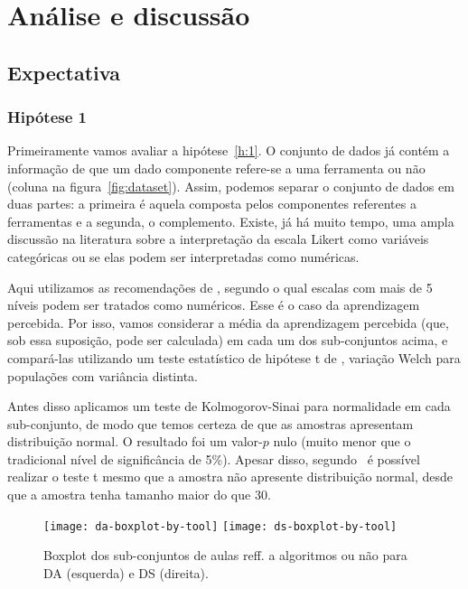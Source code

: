\section{Análise e discussão}

\subsection{Expectativa}

\subsubsection{Hipótese 1}

Primeiramente vamos avaliar a hipótese~\ref{h:1}.
O conjunto de dados já contém a informação de que um dado componente refere-se a uma ferramenta ou não (coluna  na figura~\ref{fig:dataset}).
Assim, podemos separar o conjunto de dados em duas partes: a primeira é aquela composta pelos componentes referentes a ferramentas e a segunda, o complemento.
Existe, já há muito tempo, uma ampla discussão na literatura sobre a interpretação da escala Likert como variáveis categóricas ou se elas podem ser interpretadas como numéricas.

Aqui utilizamos as recomendações de \cite{Harpe2015}, segundo o qual escalas com mais de 5 níveis podem ser tratados como numéricos.
Esse é o caso da aprendizagem percebida.
Por isso, vamos considerar a média da aprendizagem percebida (que, sob essa suposição, pode ser calculada) em cada um dos sub-conjuntos acima, e compará-las utilizando um teste estatístico de hipótese t de , variação Welch para populações com variância distinta.

Antes disso aplicamos um teste de Kolmogorov-Sinai para normalidade em cada sub-conjunto, de modo que temos certeza de que as amostras apresentam distribuição normal.
O resultado foi um valor-$p$ nulo (muito menor que o tradicional nível de significância de 5\%).
Apesar disso, segundo~\cite[p.~259]{Triola2005} é possível realizar o teste t mesmo que a amostra não apresente distribuição normal, desde que a amostra tenha tamanho maior do que 30.

\begin{figure}
	\centering
	\texttt{[image: da-boxplot-by-tool]}\hfill
	\texttt{[image: ds-boxplot-by-tool]}
	\caption{Boxplot dos sub-conjuntos de aulas reff. a algoritmos ou não para DA (esquerda) e DS (direita).}
\end{figure}

